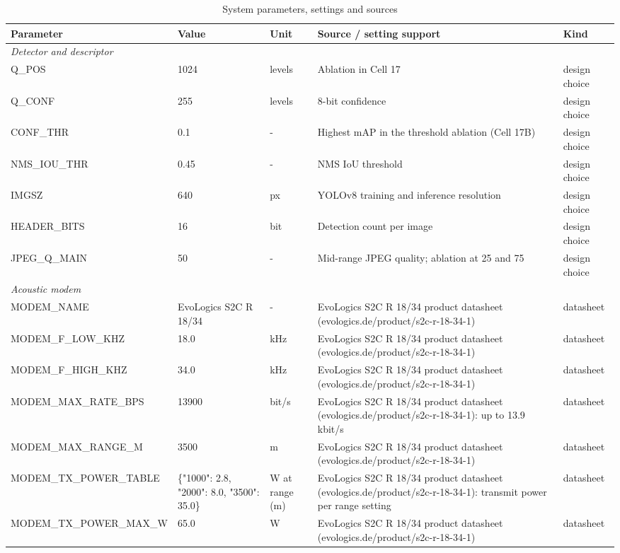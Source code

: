 \begin{table}[t]
\centering
\caption{System parameters, settings and sources}
\label{tab:params}
\footnotesize
\begin{tabular}{p{3.3cm}p{2.6cm}p{1.6cm}p{6.6cm}p{2.0cm}}
\hline
Parameter & Value & Unit & Source / setting support & Kind \\
\hline
\multicolumn{5}{l}{\textit{Detector and descriptor}} \\
Q\_POS & 1024 & levels & Ablation in Cell 17 & design choice \\
Q\_CONF & 255 & levels & 8-bit confidence & design choice \\
CONF\_THR & 0.1 & - & Highest mAP in the threshold ablation (Cell 17B) & design choice \\
NMS\_IOU\_THR & 0.45 & - & NMS IoU threshold & design choice \\
IMGSZ & 640 & px & YOLOv8 training and inference resolution & design choice \\
HEADER\_BITS & 16 & bit & Detection count per image & design choice \\
JPEG\_Q\_MAIN & 50 & - & Mid-range JPEG quality; ablation at 25 and 75 & design choice \\
\multicolumn{5}{l}{\textit{Acoustic modem}} \\
MODEM\_NAME & EvoLogics S2C R 18/34 & - & EvoLogics S2C R 18/34 product datasheet (evologics.de/product/s2c-r-18-34-1) & datasheet \\
MODEM\_F\_LOW\_KHZ & 18.0 & kHz & EvoLogics S2C R 18/34 product datasheet (evologics.de/product/s2c-r-18-34-1) & datasheet \\
MODEM\_F\_HIGH\_KHZ & 34.0 & kHz & EvoLogics S2C R 18/34 product datasheet (evologics.de/product/s2c-r-18-34-1) & datasheet \\
MODEM\_MAX\_RATE\_BPS & 13900 & bit/s & EvoLogics S2C R 18/34 product datasheet (evologics.de/product/s2c-r-18-34-1): up to 13.9 kbit/s & datasheet \\
MODEM\_MAX\_RANGE\_M & 3500 & m & EvoLogics S2C R 18/34 product datasheet (evologics.de/product/s2c-r-18-34-1) & datasheet \\
MODEM\_TX\_POWER\_TABLE & \{"1000": 2.8, "2000": 8.0, "3500": 35.0\} & W at range (m) & EvoLogics S2C R 18/34 product datasheet (evologics.de/product/s2c-r-18-34-1): transmit power per range setting & datasheet \\
MODEM\_TX\_POWER\_MAX\_W & 65.0 & W & EvoLogics S2C R 18/34 product datasheet (evologics.de/product/s2c-r-18-34-1) & datasheet \\

\end{tabular}
\end{table}
